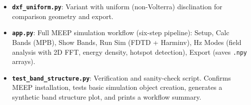 \documentclass[12pt,a4paper,oneside]{book}
\theoremstyle{plain}
\theoremstyle{definition}
\theoremstyle{remark}
\begin{document}
\begin{itemize}
  \item \textbf{\texttt{dxf\_uniform.py}}: Variant with uniform (non-Volterra) disclination for comparison geometry and export.

  \item \textbf{\texttt{app.py}}: Full MEEP simulation workflow (six-step pipeline): Setup, Calc Bands (MPB), Show Bands, Run Sim (FDTD + Harminv), Hz Modes (field analysis with 2D FFT, energy density, hotspot detection), Export (saves \texttt{.npy} arrays).

  \item \textbf{\texttt{test\_band\_structure.py}}: Verification and sanity-check script. Confirms MEEP installation, tests basic simulation object creation, generates a synthetic band structure plot, and prints a workflow summary.
\end{itemize}
\end{document}
